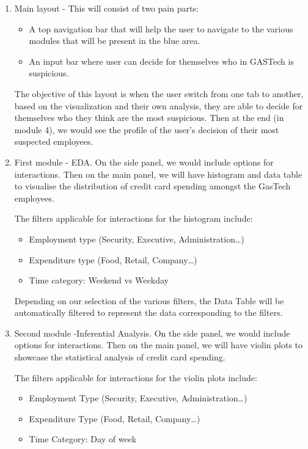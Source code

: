 \documentclass{acm_proc_article-sp}
\providecommand{\tightlist}{%
  \setlength{\itemsep}{0pt}\setlength{\parskip}{0pt}}
\begin{document}
\begin{enumerate}
\def\labelenumi{\arabic{enumi}.}
\item
  Main layout - This will consist of two pain parts:

  \begin{itemize}
  \tightlist
  \item
    A top navigation bar that will help the user to navigate to the various modules that will be present in the blue area.
  \item
    An input bar where user can decide for themselves who in GASTech is suspicious.
  \end{itemize}

  The objective of this layout is when the user switch from one tab to another, based on the visualization and their own analysis, they are able to decide for themselves who they think are the most suspicious. Then at the end (in module 4), we would see the profile of the user's decision of their most suspected employees.
\item
  First module - EDA. On the side panel, we would include options for interactions. Then on the main panel, we will have histogram and data table to visualise the distribution of credit card spending amongst the GasTech employees.

  The filters applicable for interactions for the histogram include:

  \begin{itemize}
  \tightlist
  \item
    Employment type (Security, Executive, Administration\ldots{})
  \item
    Expenditure type (Food, Retail, Company\ldots{})
  \item
    Time category: Weekend vs Weekday
  \end{itemize}

  Depending on our selection of the various filters, the Data Table will be automatically filtered to represent the data corresponding to the filters.
\item
  Second module -Inferential Analysis. On the side panel, we would include options for interactions. Then on the main panel, we will have violin plots to showcase the statistical analysis of credit card spending.

  The filters applicable for interactions for the violin plots include:

  \begin{itemize}
  \tightlist
  \item
    Employment Type (Security, Executive, Administration\ldots{})
  \item
    Expenditure Type (Food, Retail, Company\ldots{})
  \item
    Time Category: Day of week
  \end{itemize}


\end{enumerate}
\end{document}
